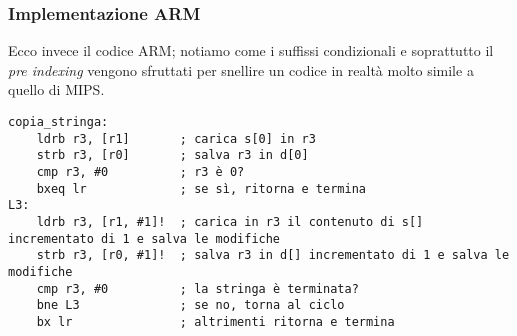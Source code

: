 \documentclass[class=book, crop=false, oneside]{standalone}
\begin{document}
\subsubsection{Implementazione ARM}
Ecco invece il codice ARM; notiamo come i suffissi condizionali  e soprattutto il \emph{pre indexing} vengono sfruttati per snellire un codice in realtà molto simile a quello di MIPS.
\begin{verbatim}
copia_stringa:
	ldrb r3, [r1]       ; carica s[0] in r3
	strb r3, [r0]       ; salva r3 in d[0]
	cmp r3, #0          ; r3 è 0?
	bxeq lr             ; se sì, ritorna e termina
L3:
	ldrb r3, [r1, #1]!  ; carica in r3 il contenuto di s[] incrementato di 1 e salva le modifiche
	strb r3, [r0, #1]!  ; salva r3 in d[] incrementato di 1 e salva le modifiche
	cmp r3, #0          ; la stringa è terminata?
	bne L3              ; se no, torna al ciclo
	bx lr               ; altrimenti ritorna e termina
\end{verbatim}
\end{document}
